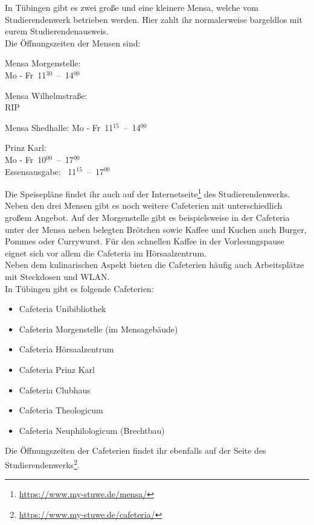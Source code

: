 In Tübingen gibt es zwei große und eine kleinere Mensa, welche vom Studierendenwerk betrieben werden. Hier zahlt ihr normalerweise bargeldlos mit eurem Studierendenausweis.\\
Die Öffnungszeiten der Mensen sind:
\begin{center}

Mensa Morgenstelle:\\
Mo - Fr~11$^{\underline{30}}$~--~14$^{\underline{00}}$

\bigskip

Mensa Wilhelmstraße:\\
RIP\\

\bigskip

Mensa Shedhalle:
Mo - Fr~11$^{\underline{15}}$~--~14$^{\underline{00}}$

\nopagebreak
Prinz Karl:\\
Mo - Fr~10$^{\underline{00}}$~--~17$^{\underline{00}}$\\
Essensausgabe: ~11$^{\underline{15}}$~--~17$^{\underline{00}}$

\end{center}

Die Speisepläne findet ihr auch auf der Internetseite\footnote{\url{https://www.my-stuwe.de/mensa/}} des Studierendenwerks.\\	%

Neben den drei Mensen gibt es noch weitere Cafeterien mit unterschiedlich großem Angebot. Auf der Morgenstelle gibt es beispielsweise in der Cafeteria unter der Mensa neben belegten Brötchen sowie Kaffee und Kuchen auch Burger, Pommes oder Currywurst. Für den schnellen Kaffee in der Vorlesungspause eignet sich vor allem die Cafeteria im Hörsaalzentrum.\\
Neben dem kulinarischen Aspekt bieten die Cafeterien häufig auch Arbeitsplätze mit Steckdosen und WLAN.\\
In Tübingen gibt es folgende Cafeterien:
\begin{itemize}
	\item Cafeteria Unibibliothek
	\item Cafeteria Morgenstelle (im Mensagebäude)
	\item Cafeteria Hörsaalzentrum
	\item Cafeteria Prinz Karl
	\item Cafeteria Clubhaus
	\item Cafeteria Theologicum
	\item Cafeteria Neuphilologicum (Brechtbau)
\end{itemize}
Die Öffnungszeiten der Cafeterien findet ihr ebenfalls auf der Seite des Studierendenwerks\footnote{\url{https://www.my-stuwe.de/cafeteria/}}.	%
